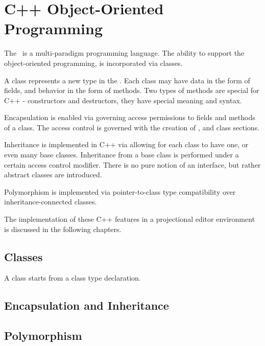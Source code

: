 \chapter{C++ Object-Oriented Programming}

The \cpppl\ is a multi-paradigm programming language. The ability to support the object-oriented programming,
is incorporated via classes. 

A class represents a new type in the \cpppl. Each class may have data in the 
form of fields, and behavior in the form of methods. Two types of methods are special for
C++ - constructors and destructors, they have special meaning and syntax.

Encapsulation is enabled via governing access permissions to fields and methods of a class.
The access control is governed with the creation of ,  and 
class sections.

Inheritance is implemented in C++ via allowing for each class to have one, or even many base classes.
Inheritance from a base class is performed under a certain access control modifier. There is no pure notion 
of an interface, but rather abstract classes are introduced.

Polymorphism is implemented via pointer-to-class type compatibility over inheritance-connected classes.

The implementation of these C++ features in a projectional editor environment is discussed in the
following chapters.


\section{Classes}
\label{section:classes}

A class starts from a class type declaration.








\section{Encapsulation and Inheritance}

\section{Polymorphism}

